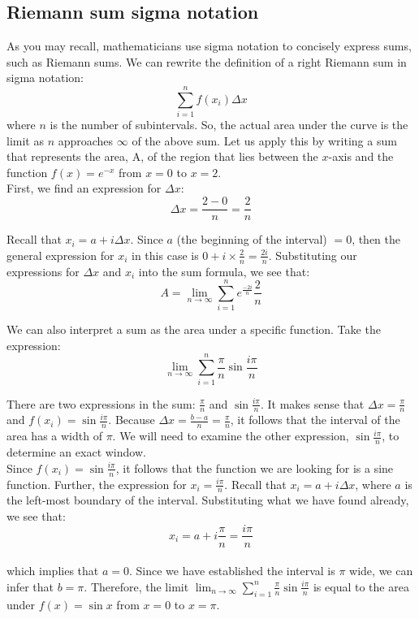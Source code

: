 \subsection{Riemann sum sigma notation}
As you may recall, mathematicians use sigma notation to concisely express sums, such as Riemann sums. We can rewrite the definition of a right Riemann sum in sigma notation:\\
$$\sum_{i=1}^{n}f(x_{i})\Delta x$$ where $n$ is the number of subintervals. So, the actual area under the curve is the limit as $n$ approaches $\infty$ of the above sum. Let us apply this by writing a sum that represents the area, A, of the region that lies between the $x$-axis and the function $f(x) = e^{-x}$ from $x=0$ to $x=2$. \\

First, we find an expression for $\Delta x$:\\
$$\Delta x = \frac{2-0}{n}=\frac{2}{n}$$

Recall that $x_i = a+i\Delta x$. Since $a$ (the beginning of the interval) $=0$, then the general expression for $x_i$ in this case is $0+i\times\frac{2}{n}=\frac{2i}{n}$. Substituting our expressions for $\Delta x$ and $x_i$ into the sum formula, we see that:\\
$$A=\lim_{n\to\infty}\sum_{i=1}^{n}e^{\frac{-2i}{n}}\frac{2}{n}$$

We can also interpret a sum as the area under a specific function. Take the expression:\\
$$\lim_{n\to \infty} \sum_{i=1}^{n}\frac{\pi}{n}\sin{\frac{i\pi}{n}}$$

There are two expressions in the sum: $\frac{\pi}{n}$ and $\sin{\frac{i\pi}{n}}$. It makes sense that $\Delta x = \frac{\pi}{n}$ and $f(x_i)=\sin{\frac{i\pi}{n}}$. Because $\Delta x = \frac{b-a}{n}=\frac{\pi}{n}$, it follows that the interval of the area has a width of $\pi$. We will need to examine the other expression, $\sin{\frac{i\pi}{n}}$, to determine an exact window. \\

Since $f(x_i) = \sin{\frac{i\pi}{n}}$, it follows that the function we are looking for is a sine function. Further, the expression for $x_i = \frac{i\pi}{n}$. Recall that $x_i = a + i\Delta x$, where $a$ is the left-most boundary of the interval. Substituting what we have found already, we see that:\\
$$x_i=a+i\frac{\pi}{n} = \frac{i\pi}{n}$$\\
which implies that $a=0$. Since we have established the interval is $\pi$ wide, we can infer that $b=\pi$. Therefore, the limit $\lim_{n\to \infty}\sum_{i=1}^{n}\frac{\pi}{n}\sin{\frac{i\pi}{n}}$ is equal to the area under $f(x) = \sin{x}$ from $x=0$ to $x=\pi$.

